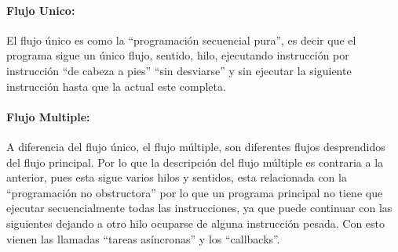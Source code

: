 \documentclass[spanish,12pt,letterpapper]{article}
\begin{document}
	\paragraph{Flujo Unico:} El flujo único es como la ``programación secuencial pura'', es decir que el programa sigue un único flujo, sentido, hilo, ejecutando instrucción por instrucción ``de cabeza a pies'' ``sin desviarse'' y sin ejecutar la siguiente instrucción hasta que la actual este completa.
	
	\paragraph{Flujo Multiple: } A diferencia del flujo único, el flujo múltiple, son diferentes flujos desprendidos del flujo principal. Por lo que la descripción del flujo múltiple es contraria a la anterior, pues esta sigue varios hilos y sentidos, esta relacionada con la ``programación no obstructora'' por lo que un programa principal no tiene que ejecutar secuencialmente todas las instrucciones, ya que puede continuar con las siguientes dejando a otro hilo ocuparse de alguna instrucción pesada. Con esto vienen las llamadas ``tareas asíncronas'' y los ``callbacks''.
	
	
\end{document}
